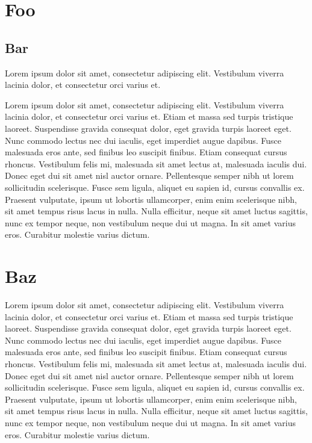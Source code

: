 

\chapter{Foo}

\section{Bar}

Lorem ipsum dolor sit amet, consectetur adipiscing elit. Vestibulum viverra
lacinia dolor, et consectetur orci varius et.

Lorem ipsum dolor sit amet, consectetur adipiscing elit. Vestibulum viverra
lacinia dolor, et consectetur orci varius et. Etiam et massa sed turpis
tristique laoreet. Suspendisse gravida consequat dolor, eget gravida turpis
laoreet eget. Nunc commodo lectus nec dui iaculis, eget imperdiet augue dapibus.
Fusce malesuada eros ante, sed finibus leo suscipit finibus. Etiam consequat
cursus rhoncus. Vestibulum felis mi, malesuada sit amet lectus at, malesuada
iaculis dui. Donec eget dui sit amet nisl auctor ornare. Pellentesque semper
nibh ut lorem sollicitudin scelerisque. Fusce sem ligula, aliquet eu sapien id,
cursus convallis ex. Praesent vulputate, ipsum ut lobortis ullamcorper, enim
enim scelerisque nibh, sit amet tempus risus lacus in nulla. Nulla efficitur,
neque sit amet luctus sagittis, nunc ex tempor neque, non vestibulum neque dui
ut magna. In sit amet varius eros. Curabitur molestie varius dictum.


\chapter{Baz}

Lorem ipsum dolor sit amet, consectetur adipiscing elit. Vestibulum viverra
lacinia dolor, et consectetur orci varius et. Etiam et massa sed turpis
tristique laoreet. Suspendisse gravida consequat dolor, eget gravida turpis
laoreet eget. Nunc commodo lectus nec dui iaculis, eget imperdiet augue dapibus.
Fusce malesuada eros ante, sed finibus leo suscipit finibus. Etiam consequat
cursus rhoncus. Vestibulum felis mi, malesuada sit amet lectus at, malesuada
iaculis dui. Donec eget dui sit amet nisl auctor ornare. Pellentesque semper
nibh ut lorem sollicitudin scelerisque. Fusce sem ligula, aliquet eu sapien id,
cursus convallis ex. Praesent vulputate, ipsum ut lobortis ullamcorper, enim
enim scelerisque nibh, sit amet tempus risus lacus in nulla. Nulla efficitur,
neque sit amet luctus sagittis, nunc ex tempor neque, non vestibulum neque dui
ut magna. In sit amet varius eros. Curabitur molestie varius dictum.


